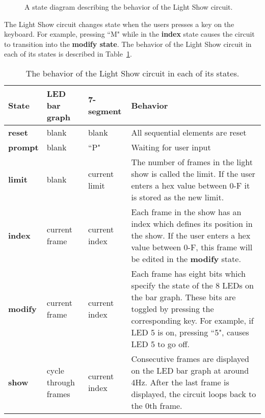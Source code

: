 \begin{figure}[ht]
    \caption{A state diagram describing the behavior of the Light Show circuit.}
    \label{fig:datapathControlLSbehavior}
\end{figure}

The Light Show circuit changes state when the users presses a key on
the keyboard. For example, pressing ``M" while in the \textbf{ index } state causes
the circuit to transition into the \textbf{ modify state}. The behavior of the
Light Show circuit in each of its states is described in
Table~\ref{table:LSbehavior}.

\begin{table}
    \begin{tabular}{l|l|l|p{2.0in}}
        \textbf{ State }    & LED bar graph    & 7-segment    & Behavior                 \\ \hline \hline
        \textbf{ reset }    & blank        & blank        & All sequential elements are reset     \\ \hline
        \textbf{ prompt }    & blank        & ``P"        & Waiting for user input        \\ \hline
        \textbf{ limit }    & blank        & current limit    & The number of frames in the light show is called
        the limit. If the user enters a hex value between 0-F it is stored as the new limit. \\  \hline
        \textbf{ index }    & current frame    & current index    & Each frame in the show has an index which defines
        its position in the show. If the user enters a hex value between 0-F, this frame will
        be edited in the \textbf{ modify } state.                         \\ \hline
        \textbf{ modify }    & current frame    & current index    & Each frame has eight bits which specify
        the state of
        the 8 LEDs on the bar graph.  These bits are toggled by pressing the corresponding
        key. For example, if LED 5 is on, pressing ``5", causes LED 5
        to go off.                                \\ \hline
        \textbf{ show }    & cycle through frames & current index & Consecutive frames are displayed on the
        LED bar graph at around 4Hz. After the last frame is displayed, the circuit loops
        back to the 0th frame.                             \\
    \end{tabular}
    \caption{The behavior of the Light Show circuit in each of its states.}
    \label{table:LSbehavior}
\end{table}

